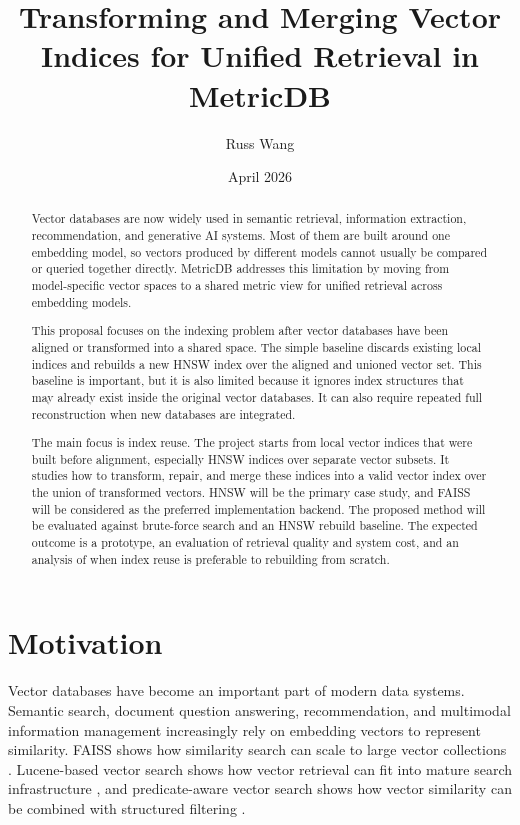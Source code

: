 \documentclass[11pt]{article}
\title{Transforming and Merging Vector Indices for Unified Retrieval in MetricDB}
\author{Russ Wang}
\date{April 2026}
\begin{document}
\maketitle

\begin{abstract}
Vector databases are now widely used in semantic retrieval, information extraction, recommendation, and generative AI systems. Most of them are built around one embedding model, so vectors produced by different models cannot usually be compared or queried together directly. MetricDB addresses this limitation by moving from model-specific vector spaces to a shared metric view for unified retrieval across embedding models.

This proposal focuses on the indexing problem after vector databases have been aligned or transformed into a shared space. The simple baseline discards existing local indices and rebuilds a new HNSW index over the aligned and unioned vector set. This baseline is important, but it is also limited because it ignores index structures that may already exist inside the original vector databases. It can also require repeated full reconstruction when new databases are integrated.

The main focus is index reuse. The project starts from local vector indices that were built before alignment, especially HNSW indices over separate vector subsets. It studies how to transform, repair, and merge these indices into a valid vector index over the union of transformed vectors. HNSW will be the primary case study, and FAISS will be considered as the preferred implementation backend. The proposed method will be evaluated against brute-force search and an HNSW rebuild baseline. The expected outcome is a prototype, an evaluation of retrieval quality and system cost, and an analysis of when index reuse is preferable to rebuilding from scratch.
\end{abstract}

\section{Motivation}

Vector databases have become an important part of modern data systems. Semantic search, document question answering, recommendation, and multimodal information management increasingly rely on embedding vectors to represent similarity. FAISS shows how similarity search can scale to large vector collections \cite{johnson2017faiss}. Lucene-based vector search shows how vector retrieval can fit into mature search infrastructure \cite{lin2023lucene}, and predicate-aware vector search shows how vector similarity can be combined with structured filtering \cite{patel2024acorn}.
\end{document}
